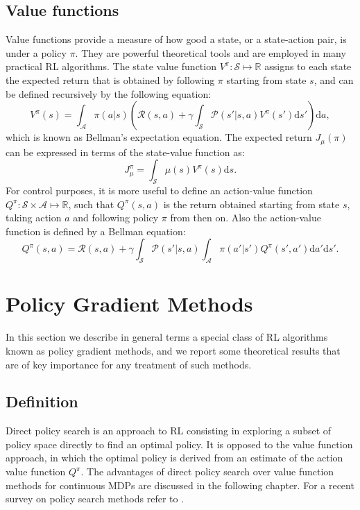 \subsection{Value functions}
Value functions provide a measure of how good a state, or a state-action pair, is under a policy $\pi$. They are powerful theoretical tools and are employed in many practical \ac{RL} algorithms.
The state value function $V^\pi \colon \mathcal{S} \mapsto \mathbb{R}$ assigns to each state the expected return that is obtained by following $\pi$ starting from state $s$, and can be defined recursively by the following equation:
\[
	V^{\pi}(s) = \int_{\mathcal{A}}\pi(a|s)\left(\mathcal{R}(s,a) + 
		\gamma\int_{\mathcal{S}}\mathcal{P}(s'|s,a)V^{\pi}(s')\mathrm{d}s'\right)\mathrm{d}a,
\]
which is known as Bellman's expectation equation.
The expected return $J_\mu(\pi)$ can be expressed in terms of the state-value function as:
\[
	J_{\mu}^{\pi} = \int_{\mathcal{S}}\mu(s)V^{\pi}(s)\mathrm{d}s.
\]
For control purposes, it is more useful to define an action-value function $Q^\pi \colon \mathcal{S} \times \mathcal{A} \mapsto \mathbb{R}$, such that $Q^\pi(s,a)$ is the return obtained starting from state $s$, taking action $a$ and following policy $\pi$ from then on. Also the action-value function is defined by a Bellman equation:
\[
	Q^{\pi}(s,a) = \mathcal{R}(s,a) + \gamma\int_{\mathcal{S}}\mathcal{P}(s'|s,a)
		\int_{\mathcal{A}}\pi(a'|s')Q^{\pi}(s',a')\mathrm{d}a'\mathrm{d}s'.
\]


\section{Policy Gradient Methods}
	In this section we describe in general terms a special class of \ac{RL} algorithms known as policy gradient methods, and we report some theoretical results that are of key importance for any treatment of such methods.

\subsection{Definition}
Direct policy search is an approach to \ac{RL} consisting in exploring a subset of policy space directly to find an optimal policy. It is opposed to the value function approach, in which the optimal policy is derived from an estimate of the action value function $Q^\pi$. The advantages of direct policy search over value function methods for continuous \ac{MDP}s are discussed in the following chapter. For a recent survey on policy search methods refer to \cite{deisenroth2013survey}.

